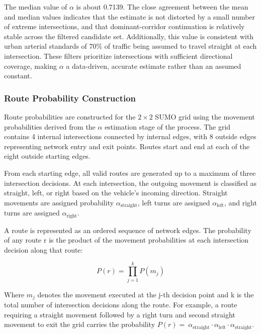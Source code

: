 \documentclass[12pt]{article}
\begin{document}
The median value of $\alpha$ is about 0.7139. The close agreement between the mean and median values indicates that the estimate is not distorted by a small number of extreme intersections, and that dominant-corridor continuation is relatively stable across the filtered candidate set. Additionally, this value is consistent with urban arterial standards of 70\% of traffic being assumed to travel straight at each intersection. These filters prioritize intersections with sufficient directional coverage, making $\alpha$ a data-driven, accurate estimate rather than an assumed constant.

\subsubsection{Route Probability Construction}

Route probabilities are constructed for the $2 \times 2$ SUMO grid using the movement probabilities derived from the $\alpha$ estimation stage of the process. The grid contains 4 internal intersections connected by internal edges, with 8 outside edges representing network entry and exit points. Routes start and end at each of the eight outside starting edges.

From each starting edge, all valid routes are generated up to a maximum of three intersection decisions. At each intersection, the outgoing movement is classified as straight, left, or right based on the vehicle's incoming direction. Straight movements are assigned probability \(\alpha_{\text{straight}}\), left turns are assigned \(\alpha_{\text{left}}\), and right turns are assigned \(\alpha_{\text{right}}\).

A route is represented as an ordered sequence of network edges. The probability of any route r is the product of the movement probabilities at each intersection decision along that route:

\begin{equation}
\label{eq:prob_route}
    P(r) = \prod_{j=1}^{k} P(m_j)
\end{equation}



Where \(m_{j}\) denotes the movement executed at the j-th decision point and k is the total number of intersection decisions along the route. For example, a route requiring a straight movement followed by a right turn and second straight movement to exit the grid carries the probability \(P(r) = \ \alpha_{\text{straight}} \cdot \alpha_{\text{left}} \cdot \alpha_{\text{straight}}\).
\end{document}
